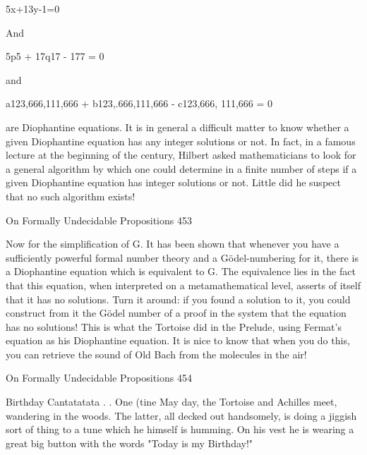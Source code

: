                                                5x+13y-1=0

                                                    And

                                        5p5 + 17q17 - 177 = 0

                                                    and

                         a123,666,111,666 + b123,.666,111,666 - c123,666, 111,666 = 0

are Diophantine equations. It is in general a difficult matter to know whether a given
Diophantine equation has any integer solutions or not. In fact, in a famous lecture at the
beginning of the century, Hilbert asked mathematicians to look for a general algorithm by
which one could determine in a finite number of steps if a given Diophantine equation
has integer solutions or not. Little did he suspect that no such algorithm exists!




On Formally Undecidable Propositions                                                    453

Now for the simplification of G. It has been shown that whenever you have a sufficiently
powerful formal number theory and a Gödel-numbering for it, there is a Diophantine
equation which is equivalent to G. The equivalence lies in the fact that this equation,
when interpreted on a metamathematical level, asserts of itself that it has no solutions.
Turn it around: if you found a solution to it, you could construct from it the Gödel
number of a proof in the system that the equation has no solutions! This is what the
Tortoise did in the Prelude, using Fermat's equation as his Diophantine equation. It is
nice to know that when you do this, you can retrieve the sound of Old Bach from the
molecules in the air!




On Formally Undecidable Propositions                                                 454

                           Birthday Cantatatata . .
   One (tine May day, the Tortoise and Achilles meet, wandering in the woods.
   The latter, all decked out handsomely, is doing a jiggish sort of thing to a
   tune which he himself is humming. On his vest he is wearing a great big
   button with the words "Today is my Birthday!"

